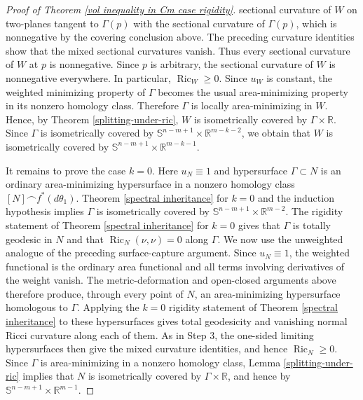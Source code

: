 \documentclass[11pt]{amsart}
\DeclareMathOperator{\Ric}{Ric}
\theoremstyle{definition}
\theoremstyle{remark}
\numberwithin{equation}{section}
\begin{document}
\begin{proof}[Proof of Theorem \ref{vol inequality in Cm case rigidity}]
      sectional curvature of $W$ on two-planes tangent to $\Gamma(p)$ with the
      sectional curvature of $\Gamma(p)$, which is nonnegative by the covering conclusion
      above. The preceding curvature identities show that the mixed sectional curvatures vanish.
      Thus every sectional curvature of $W$ at $p$ is nonnegative. Since $p$ is arbitrary,
      the sectional curvature of $W$ is nonnegative everywhere. In particular,
      $\Ric_{W}\geq0$. Since $u_W$ is constant, the weighted minimizing property of
      $\Gamma$ becomes the usual area-minimizing property in its nonzero homology class.
      Therefore $\Gamma$ is locally area-minimizing in $W$. Hence, by Theorem
      \ref{splitting-under-ric}, $W$ is isometrically covered by
      $\Gamma\times \mathbb{R}$. Since $\Gamma$ is isometrically covered by
      $\mathbb{S}^{n-m+1}\times \mathbb{R}^{m-k-2}$, we obtain that $W$ is isometrically
      covered by $\mathbb{S}^{n-m+1}\times \mathbb{R}^{m-k-1}$.
      

It remains to prove the case $k=0$. Here $u_{N}\equiv1$ and hypersurface $\Gamma\subset N$
  is an ordinary area-minimizing hypersurface in a nonzero homology class $[N]\frown f^{*}(d\theta_{1})$. Theorem \ref{spectral inheritance} for $k=0$ and  the induction hypothesis implies $\Gamma$ is
  isometrically covered by $\mathbb{S}^{n-m+1}\times\mathbb{R}^{m-2}$. The
  rigidity statement of Theorem \ref{spectral inheritance} for $k=0$ gives that $\Gamma$ is
  totally geodesic in $N$ and that $\Ric_N(\nu,\nu)=0$ along $\Gamma$. We now use the unweighted
  analogue of the preceding surface-capture argument. Since $u_N\equiv1$, the weighted functional
  is the ordinary area functional and all terms involving derivatives of the weight vanish. The
  metric-deformation and open-closed arguments above therefore produce, through every point of
  $N$, an area-minimizing hypersurface homologous to $\Gamma$. Applying the $k=0$ rigidity statement
  of Theorem \ref{spectral inheritance} to these hypersurfaces gives total geodesicity and
  vanishing normal Ricci curvature along each of them. As in Step 3, the one-sided limiting
  hypersurfaces then give the mixed curvature identities, and hence $\Ric_N\geq0$. Since $\Gamma$ is
  area-minimizing in a nonzero homology class, Lemma \ref{splitting-under-ric} implies that $N$ is
  isometrically covered by $\Gamma\times\mathbb{R}$, and hence by
  $\mathbb{S}^{n-m+1}\times\mathbb{R}^{m-1}$.
\end{proof}
    


\end{document}
